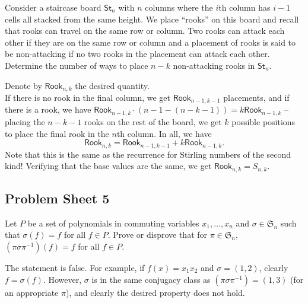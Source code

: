 	\begin{problem}
		Consider a staircase board $\mathsf{St}_n$ with $n$ columns where the $i$th column has $i-1$ cells all stacked from the same height. We place ``rooks'' on this board and recall that rooks can travel on the same row or column. Two rooks can attack each other if they are on the same row or column and a placement of rooks is said to be non-attacking if no two rooks in the placement can attack each other. Determine the number of ways to place $n-k$ non-attacking rooks in $\mathsf{St}_n$.
	\end{problem}
	\begin{solution*}
		Denote by $\mathsf{Rook}_{n,k}$ the desired quantity.\\
		If there is no rook in the final column, we get $\mathsf{Rook}_{n-1,k-1}$ placements, and if there is a rook, we have $\mathsf{Rook}_{n-1,k} \cdot (n-1 - (n-k-1)) = k \mathsf{Rook}_{n-1,k}$ -- placing the $n-k-1$ rooks on the rest of the board, we get $k$ possible positions to place the final rook in the $n$th column. In all, we have
		\[ \mathsf{Rook}_{n,k} = \mathsf{Rook}_{n-1,k-1} + k \mathsf{Rook}_{n-1,k}. \]
		Note that this is the same as the recurrence for Stirling numbers of the second kind! Verifying that the base values are the same, we get $\mathsf{Rook}_{n,k} = S_{n,k}$.
	\end{solution*}

\subsection{Problem Sheet 5}

	\begin{problem}
		Let $P$ be a set of polynomials in commuting variables $x_1,\ldots,x_n$ and $\sigma \in \mathfrak{S}_n$ such that $\sigma(f) = f$ for all $f \in P$. Prove or disprove that for $\pi \in \mathfrak{S}_n$, $(\pi\sigma\pi^{-1})(f) = f$ for all $f \in P$.
	\end{problem}
	\begin{solution*}
		The statement is false. For example, if $f(x) = x_1x_2$ and $\sigma = (1,2)$, clearly $f = \sigma(f)$. However, $\sigma$ is in the same conjugacy class as $(\pi\sigma\pi^{-1}) = (1,3)$ (for an appropriate $\pi$), and clearly the desired property does not hold.
	\end{solution*}